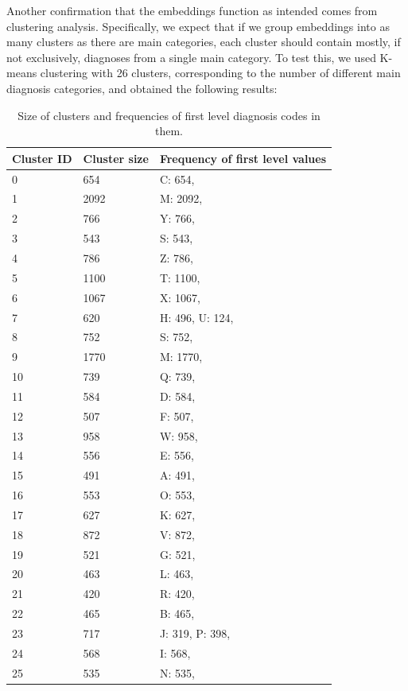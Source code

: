 Another confirmation that the embeddings function as intended comes from clustering analysis. Specifically, we expect that if we group embeddings into as many clusters as there are main categories, each cluster should contain mostly, if not exclusively, diagnoses from a single main category. To test this, we used K-means clustering with 26 clusters, corresponding to the number of different main diagnosis categories, and obtained the following results:

\begin{table}[!h]
	\centering
	\begin{tabular}{|p{}|p{}|p{}|}
		\hline
		Cluster ID & Cluster size & Frequency of first level values \\ \hline
		0 & 654 & C: 654, \\ \hline
		1 & 2092 & M: 2092, \\ \hline
		2 & 766 & Y: 766, \\ \hline
		3 & 543 & S: 543, \\ \hline
		4 & 786 & Z: 786, \\ \hline
		5 & 1100 & T: 1100, \\ \hline
		6 & 1067 & X: 1067, \\ \hline
		7 & 620 & H: 496, U: 124, \\ \hline
		8 & 752 & S: 752, \\ \hline
		9 & 1770 & M: 1770, \\ \hline
		10 & 739 & Q: 739, \\ \hline
		11 & 584 & D: 584, \\ \hline
		12 & 507 & F: 507, \\ \hline
		13 & 958 & W: 958, \\ \hline
		14 & 556 & E: 556, \\ \hline
		15 & 491 & A: 491, \\ \hline
		16 & 553 & O: 553, \\ \hline
		17 & 627 & K: 627, \\ \hline
		18 & 872 & V: 872, \\ \hline
		19 & 521 & G: 521, \\ \hline
		20 & 463 & L: 463, \\ \hline
		21 & 420 & R: 420, \\ \hline
		22 & 465 & B: 465, \\ \hline
		23 & 717 & J: 319, P: 398, \\ \hline
		24 & 568 & I: 568, \\ \hline
		25 & 535 & N: 535, \\ \hline
	\end{tabular}
	\caption{Size of clusters and frequencies of first level diagnosis codes in them.}
	\label{tab:diag_clusters}
\end{table}

